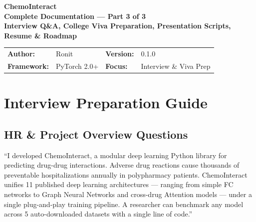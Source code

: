 \documentclass[12pt,a4paper,oneside]{article}
\begin{document}
\begin{center}
{\Huge\bfseries\color{deepblue} ChemoInteract}\\[0.3cm]
{\Large\bfseries\color{chemopurple} Complete Documentation --- Part 3 of 3}\\[0.2cm]
{\large\textbf{Interview Q\&A, College Viva Preparation, Presentation Scripts, Resume & Roadmap}}\\[0.4cm]
\begin{tcolorbox}[enhanced,width=14cm,colback=deepblue!5,colframe=deepblue,boxrule=1pt,arc=5pt]
\centering
\begin{tabular}{llll}
\textbf{Author:} & Ronit & \textbf{Version:} & 0.1.0 \\
\textbf{Framework:} & PyTorch 2.0+ & \textbf{Focus:} & Interview \& Viva Prep \\
\end{tabular}
\end{tcolorbox}
\end{center}

\tableofcontents
\newpage

\section{Interview Preparation Guide}\label{sec:interview}

\subsection{HR \& Project Overview Questions}

\begin{tcolorbox}[questionbox,title={Q1: Tell me about your final year project.}]
\end{tcolorbox}
\begin{tcolorbox}[answerbox]
``I developed ChemoInteract, a modular deep learning Python library for predicting drug-drug interactions. Adverse drug reactions cause thousands of preventable hospitalizations annually in polypharmacy patients. ChemoInteract unifies 11 published deep learning architectures --- ranging from simple FC networks to Graph Neural Networks and cross-drug Attention models --- under a single plug-and-play training pipeline. A researcher can benchmark any model across 5 auto-downloaded datasets with a single line of code.''
\end{tcolorbox}
\end{document}
